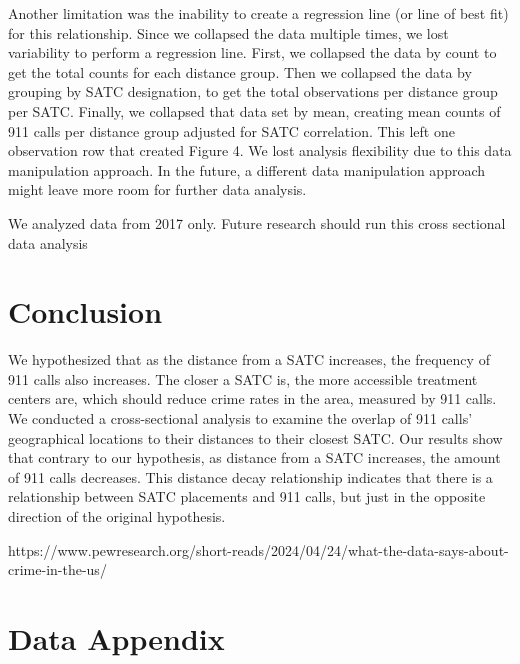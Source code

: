 \documentclass[12pt]{article}
\begin{document}
Another limitation was the inability to create a regression line (or line of best fit) for this relationship. Since we collapsed the data multiple times, we lost variability to perform a regression line. First, we collapsed the data by count to get the total counts for each distance group. Then we collapsed the data by grouping by SATC designation, to get the total observations per distance group per SATC. Finally, we collapsed that data set by mean, creating mean counts of 911 calls per distance group adjusted for SATC correlation. This left one observation row that created Figure 4. We lost analysis flexibility due to this data manipulation approach. In the future, a different data manipulation approach might leave more room for further data analysis. 

We analyzed data from 2017 only. Future research should run this cross sectional data analysis 

\section{Conclusion}
\label{sec:conclusion}

    We hypothesized that as the distance from a SATC increases, the frequency of 911 calls also increases. The closer a SATC is, the more accessible treatment centers are, which should reduce crime rates in the area, measured by 911 calls. We conducted a cross-sectional analysis to examine the overlap of 911 calls' geographical locations to their distances to their closest SATC. Our results show that contrary to our hypothesis, as distance from a SATC increases, the amount of 911 calls decreases. This distance decay relationship indicates that there is a relationship between SATC placements and 911 calls, but just in the opposite direction of the original hypothesis. 


 

\newpage
\singlespacing
\setlength\bibsep{0pt}



https://www.pewresearch.org/short-reads/2024/04/24/what-the-data-says-about-crime-in-the-us/

\newpage
\section*{Data Appendix} \label{sec:appendixa}
\end{document}
